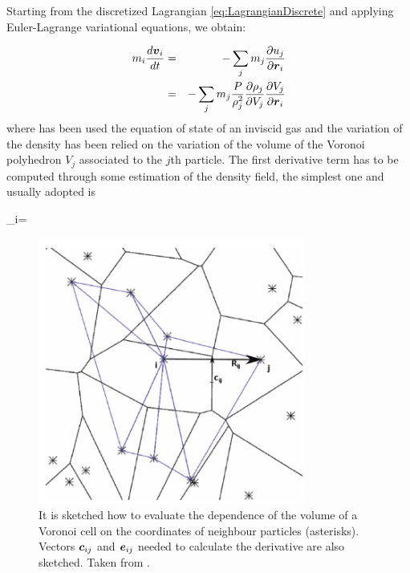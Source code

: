 \documentclass[a4,useAMS,usenatbib,usegraphicx,12pt]{article}
\begin{document}
Starting from the discretized Lagrangian \ref{eq:LagrangianDiscrete} and 
applying Euler-Lagrange variational equations, we obtain:

\begin{eqnarray}
\nonumber{}
m_i \frac{d \boldsymbol{ v }_i}{dt} &=& - \sum_j m_j \frac{\partial u_j}{\partial \boldsymbol{ r }_i} \\
\label{eq:VPHLarangian}
&=& -\sum_j m_j \frac{P}{\rho_j^2}\frac{\partial \rho_j}{\partial V_j}\frac{\partial V_j}{\partial \boldsymbol{ r }_i}
\end{eqnarray}
where has been used the equation of state of an inviscid gas and the variation
of the density has been relied on the variation of the volume of the Voronoi 
polyhedron $V_j$ associated to the $j$th particle. The first derivative term has 
to be computed through some estimation of the density field, the simplest one and 
usually adopted is 

{ \rho_i=  }

\begin{figure}[h]
\centering

  \includegraphics[trim = 0mm 0mm 0mm 0mm, clip, keepaspectratio=true,
  width=0.25\textheight]{./figures/VoronoiVolume.png}
  
  \caption{\small It is sketched how to evaluate the dependence of the volume
  of a Voronoi cell on the coordinates of neighbour particles (asterisks). 
  Vectors $\boldsymbol{ c }_{ij}$ and $\boldsymbol{ e }_{ij}$ needed to calculate the derivative
  are also sketched. Taken from \citet{Hess10}. }

  \label{fig:VoronoiVolume}

\end{figure}
\end{document}
